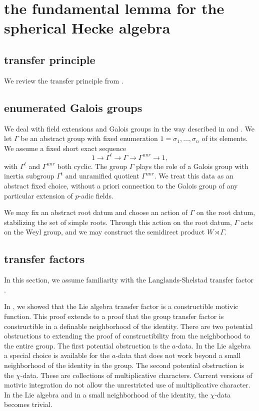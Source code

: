 \section{the fundamental lemma for the spherical Hecke algebra}


\subsection{transfer principle}

We review the transfer principle from \cite{cluckers2010constructible}.

\subsection{enumerated Galois groups}

We deal with field extensions and Galois groups in the way described in \cite{gordon} and \cite{cluckers2011transfer}.
We let $\Gamma$ be an abstract group with fixed enumeration $1=\sigma_1,\ldots,\sigma_n$ of its elements.  We
assume a fixed short exact sequence
\[
1\to \Gamma^t\to\Gamma\to\Gamma^{unr}\to 1,
\]
with $\Gamma^t$ and $\Gamma^{unr}$ both cyclic.
The group $\Gamma$ plays the role of a Galois group with inertia subgroup $\Gamma^t$ and unramified quotient $\Gamma^{unr}$.
We treat this data as an abstract fixed choice, without a priori connection to the Galois group of any particular extension of 
$p$-adic fields.  

We may fix an abstract root datum and choose an action of $\Gamma$ on the root datum, stabilizing the set of simple roots.
Through this action on the root datum, $\Gamma$ acts on the Weyl group, and we may construct the semidirect product $W\rtimes \Gamma$.

\subsection{transfer factors}

In this section, we assume familiarity with the Langlands-Shelstad transfer factor \cite{langlands1987definition}.

In \cite{gordon}, we showed that the Lie algebra transfer factor is a constructible motivic function.  This proof extends to a proof
that the group transfer factor is constructible in a definable neighborhood of the identity.  There are two potential obstructions to
extending the proof of constructibility from
the neighborhood to the entire group.  The first potential obstruction is the $a$-data.  In the Lie algebra a special choice is available
for the $a$-data that does not work beyond a small neighborhood of the identity in the group.   The second potential obstruction is 
the $\chi$-data.  These are collections of multiplicative characters.  Current versions of motivic integration do not allow the unrestricted
use of multiplicative character.  In the Lie algebra and in a small neighborhood of the identity, the $\chi$-data becomes trivial.

